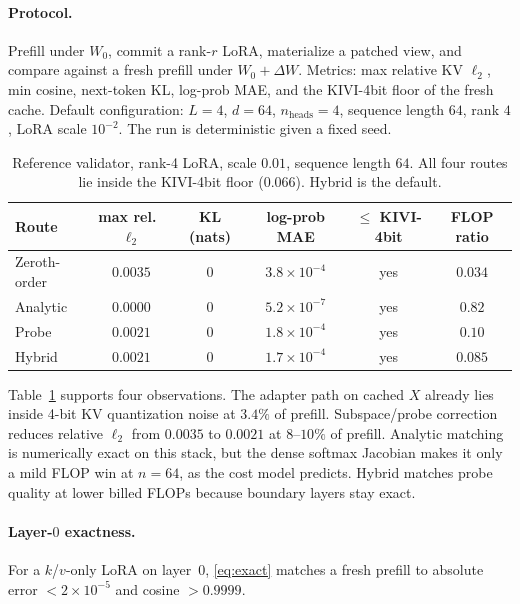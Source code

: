 \documentclass{article}
\begin{document}
\paragraph{Protocol.}
Prefill under $W_0$, commit a rank-$r$ LoRA, materialize a patched view,
and compare against a fresh prefill under $W_0+\Delta W$.
Metrics: max relative KV $\ell_2$, min cosine, next-token KL, log-prob
MAE, and the KIVI-4bit floor of the fresh cache.
Default configuration: $L{=}4$, $d{=}64$, $n_{\mathrm{heads}}{=}4$,
sequence length $64$, rank $4$, LoRA scale $10^{-2}$.
The run is deterministic given a fixed seed.

\begin{table}[t]
\centering
\caption{Reference validator, rank-4 LoRA, scale $0.01$, sequence length
$64$. All four routes lie inside the KIVI-4bit floor ($0.066$). Hybrid is
the default.}
\label{tab:bench}
\begin{tabular}{@{}lccccc@{}}
\toprule
Route & max rel.\ $\ell_2$ & KL (nats) & log-prob MAE & $\le$ KIVI-4bit & FLOP ratio \\
\midrule
Zeroth-order  & $0.0035$ & $0$ & $3.8{\times}10^{-4}$ & yes & $0.034$ \\
Analytic      & $0.0000$ & $0$ & $5.2{\times}10^{-7}$ & yes & $0.82$ \\
Probe         & $0.0021$ & $0$ & $1.8{\times}10^{-4}$ & yes & $0.10$ \\
Hybrid        & $0.0021$ & $0$ & $1.7{\times}10^{-4}$ & yes & $0.085$ \\
\bottomrule
\end{tabular}
\end{table}

Table~\ref{tab:bench} supports four observations.
The adapter path on cached $X$ already lies inside 4-bit KV quantization
noise at $3.4\%$ of prefill.
Subspace/probe correction reduces relative $\ell_2$ from $0.0035$ to
$0.0021$ at $8$--$10\%$ of prefill.
Analytic matching is numerically exact on this stack, but the dense
softmax Jacobian makes it only a mild FLOP win at $n{=}64$, as the cost
model predicts.
Hybrid matches probe quality at lower billed FLOPs because boundary
layers stay exact.

\paragraph{Layer-$0$ exactness.}
For a $k$/$v$-only LoRA on layer~$0$, \eqref{eq:exact} matches a fresh
prefill to absolute error $<2{\times}10^{-5}$ and cosine $>0.9999$.
\end{document}
